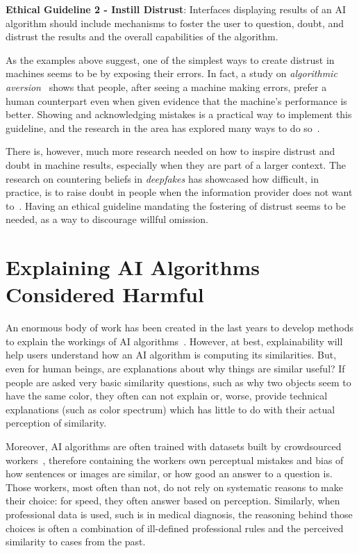 \documentclass{article}
\begin{document}
\noindent \textbf{Ethical Guideline 2 - Instill Distrust}: Interfaces displaying results of an AI algorithm should include mechanisms to foster the user to question, doubt, and distrust the results and the overall capabilities of the algorithm.

As the examples above suggest, one of  the simplest ways to create distrust in machines seems to be by exposing their errors. In fact, a study on \emph{algorithmic aversion}~\cite{dietvorst2015algorithm} shows that people, after seeing a machine making errors, prefer a human counterpart even when given evidence that the machine's performance is better. Showing and acknowledging mistakes is a practical way to implement this guideline, and the research in the area has explored many ways to do so~\cite{griethe2006visualization,han2020beyond,chiou2021trusting,mayr2019trust}.

There is, however, much more research needed on how to inspire distrust and doubt in machine results, especially when they are part of a larger context. The research on countering beliefs in \emph{deepfakes} has showcased how difficult, in practice, is to raise doubt in people when the information provider does not want to~\cite{Boyd2017DidML,Lazer1094,pennycook2020fighting,hameleers2020picture,schwarz2016making}. Having an ethical guideline mandating the fostering of distrust seems to be needed, as a way to discourage willful omission.


\section{Explaining AI Algorithms Considered Harmful}

An enormous body of work has been created in the last years to develop methods to explain the workings of AI algorithms~\cite{adadi2018peeking,ferreira2020people,xu2019explainable,dovsilovic2018explainable}. However, at best, explainability will help users understand how an AI algorithm is computing its similarities. But, even for human beings, are explanations about why things are similar useful? If people are asked very basic similarity questions, such as why two objects seem to have the same color, they often can not explain or, worse, provide technical explanations (such as color spectrum) which has little to do with their actual perception of similarity.

Moreover, AI algorithms are often trained with datasets built by crowdsourced workers~\cite{crawford2021atlas}, therefore containing the workers own perceptual mistakes and bias of how sentences or images are similar, or how good an answer to a question is. Those workers, most often than not, do not rely on systematic reasons to make their choice: for speed, they often answer based on perception. Similarly, when professional data is used, such is in medical diagnosis, the reasoning behind those choices is often a combination of ill-defined professional rules and the perceived similarity to cases from the past.
\end{document}
